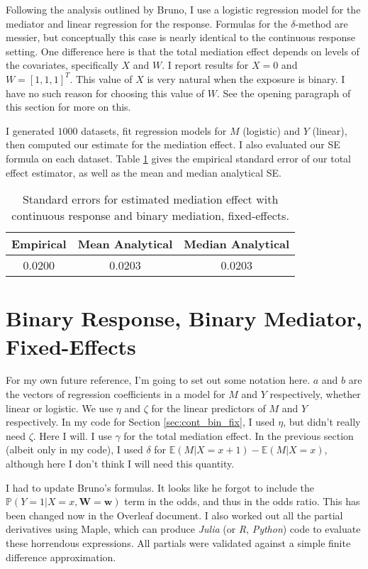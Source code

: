 \documentclass{article}
\newcommand{\bP}{\mathbb{P}}
\newcommand{\bE}{\mathbb{E}}
\begin{document}
Following the analysis outlined by Bruno, I use a logistic regression model for the mediator and linear regression for the response. Formulas for the $\delta$-method are messier, but conceptually this case is nearly identical to the continuous response setting. One difference here is that the total mediation effect depends on levels of the covariates, specifically $X$ and $W$. I report results for $X=0$ and $W = [1,1,1]^T$. This value of $X$ is very natural when the exposure is binary. I have no such reason for choosing this value of $W$. See the opening paragraph of this section for more on this.

I generated $1000$ datasets, fit regression models for $M$ (logistic) and $Y$ (linear), then computed our estimate for the mediation effect. I also evaluated our SE formula on each dataset. Table \ref{tab:SEs_cont_bin_fix} gives the empirical standard error of our total effect estimator, as well as the mean and median analytical SE.

\begin{table}
    \centering
    \begin{tabular}{|c|c|c|}
        \hline
        Empirical & Mean Analytical & Median Analytical\\
        \hline
        0.0200 & 0.0203 & 0.0203\\
        \hline
    \end{tabular}
    \caption{Standard errors for estimated mediation effect with continuous response and binary mediation, fixed-effects.}
    \label{tab:SEs_cont_bin_fix}
\end{table}


\section{Binary Response, Binary Mediator, Fixed-Effects}

For my own future reference, I'm going to set out some notation here. $a$ and $b$ are the vectors of regression coefficients in a model for $M$ and $Y$ respectively, whether linear or logistic. We use $\eta$ and $\zeta$ for the linear predictors of $M$ and $Y$ respectively. In my code for Section \ref{sec:cont_bin_fix}, I used $\eta$, but didn't really need $\zeta$. Here I will. I use $\gamma$ for the total mediation effect. In the previous section (albeit only in my code), I used $\delta$ for $\bE(M | X=x+1) - \bE(M | X=x)$, although here I don't think I will need this quantity.

I had to update Bruno's formulas. It looks like he forgot to include the $\bP(Y=1 | X=x, \mathbf{W}=\mathbf{w})$ term in the odds, and thus in the odds ratio. This has been changed now in the Overleaf document. I also worked out all the partial derivatives using Maple, which can produce \textit{Julia} (or \textit{R}, \textit{Python}) code to evaluate these horrendous expressions. All partials were validated against a simple finite difference approximation.
\end{document}
